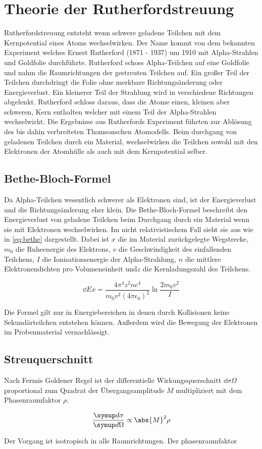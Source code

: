 \section{Theorie der Rutherfordstreuung}
\label{sec:theorie}

Rutherfordstreuung entsteht wenn schwere geladene Teilchen mit dem Kernpotential eines Atoms wechselwirken.
Der Name kommt von dem bekannten Experiment welches Ernest Rutherford (1871 - 1937)  um
1910 mit Alpha-Strahlen und Goldfolie durchführte. Rutherford schoss Alpha-Teilchen auf eine Goldfolie
und nahm die Raumrichtungen der gestreuten Teilchen auf. Ein großer Teil der Teilchen durchdringt
die Folie ohne merkbare Richtungsänderung oder Energieverlust. Ein kleinerer Teil der Strahlung wird
in verschiedene Richtungen abgelenkt. Rutherford schloss daraus, dass die Atome einen, kleinen
aber schweren, Kern enthalten welcher mit einem Teil der Alpha-Strahlen wechselwirkt.
Die Ergebnisse aus Rutherfords Experiment führten zur Ablösung des bis dahin verbreiteten
Thomsonschen Atomodells.
Beim durchgang von geladenen Teilchen durch ein Material, wechselwirken die Teilchen sowohl mit den
Elektronen der Atomhülle als auch mit dem Kernpotential selber.

\subsection{Bethe-Bloch-Formel}
\label{sub:bethe}

Da Alpha-Teilchen wesentlich schwerer als Elektronen sind,
ist der Energieverlust und die Richtungsänderung eher klein.
Die Bethe-Bloch-Formel beschreibt den Energieverlust von geladene Teilchen beim Durchgang durch ein
Material wenn sie mit Elektronen wechselwirken.
Im nicht relativistischem Fall sieht sie aus wie in \eqref{eq:bethe} dargestellt.
Dabei ist $x$ die im Material zurückgelegte Wegstrecke, $m_0$ die Ruheenergie des Elektrons,
$v$ die Geschwindigkeit des einfallenden Teilchens, $I$ die Ionisationsenergie der Alpha-Strahlung,
$n$ die mittlere Elektronendichten pro Volumeneinheit und$z$ die Kernladungszahl des Teilchens.

\begin{equation}
  \label{eq:bethe}
  \dd{E}{x} = \frac{4 \pi^4 z^2 n e^4}{m_0 v^2 (4 \pi \epsilon_0)^2} \ln \frac{2 m_0 v^2}{I}
\end{equation}

Die Formel gilt nur in Energiebereichen in denen durch Kollisionen keine Sekundärteilchen entstehen können.
Außerdem wird die Bewegung der Elektronen im Probenmaterial vernachlässigt.


\subsection{Streuquerschnitt}
Nach Fermis Goldener Regel ist der differentielle Wirkungsquerschnitt $\dd{\sigma}{\Omega}$ proportional zum Quadrat der Übergangsamplitude $M$ multipliziert mit dem Phasenraumfaktor $\rho$.

\begin{equation}
  \dd{\sigma}{\Omega} \propto \abs{M}^2 \rho
\end{equation}

Der Vorgang ist isotropisch in alle Raumrichtungen. Der phasenraumfaktor

